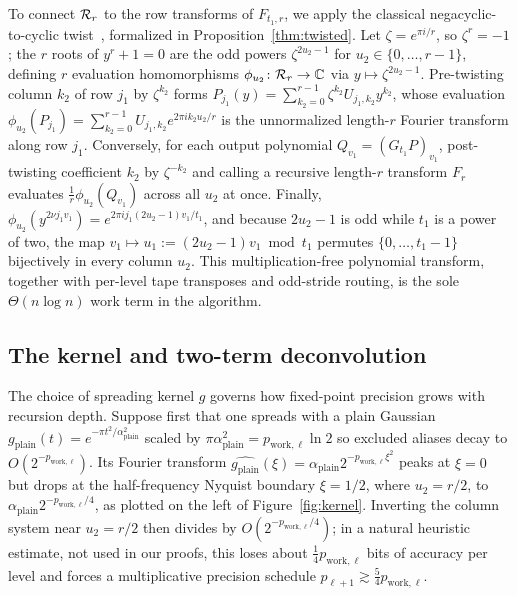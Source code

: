 To connect $\mathcal{R}_r$ to the row transforms of $F_{t_1, r}$, we apply the classical negacyclic-to-cyclic twist~\cite{SS71,CF94}, formalized in Proposition~\ref{thm:twisted}. Let $\zeta = e^{\pi i / r}$, so $\zeta^r = -1$; the $r$ roots of $y^r + 1 = 0$ are the odd powers $\zeta^{2u_2 - 1}$ for $u_2 \in \{0, \dots, r-1\}$, defining $r$ evaluation homomorphisms $\phi_{u_2}\colon \mathcal{R}_r \to \mathbb{C}$ via $y \mapsto \zeta^{2u_2 - 1}$. Pre-twisting column $k_2$ of row $j_1$ by $\zeta^{k_2}$ forms $P_{j_1}(y) = \sum_{k_2=0}^{r-1} \zeta^{k_2} U_{j_1, k_2} y^{k_2}$, whose evaluation $\phi_{u_2}(P_{j_1}) = \sum_{k_2=0}^{r-1} U_{j_1, k_2} e^{2\pi i k_2 u_2 / r}$ is the unnormalized length-$r$ Fourier transform along row $j_1$. Conversely, for each output polynomial $Q_{v_1} = (G_{t_1} P)_{v_1}$, post-twisting coefficient $k_2$ by $\zeta^{-k_2}$ and calling a recursive length-$r$ transform $F_r$ evaluates $\frac{1}{r}\phi_{u_2}(Q_{v_1})$ across all $u_2$ at once. Finally, $\phi_{u_2}(y^{2\nu j_1 v_1}) = e^{2\pi i j_1 (2u_2 - 1) v_1 / t_1}$, and because $2u_2 - 1$ is odd while $t_1$ is a power of two, the map $v_1 \mapsto u_1 := (2u_2 - 1) v_1 \bmod t_1$ permutes $\{0, \dots, t_1 - 1\}$ bijectively in every column $u_2$. This multiplication-free polynomial transform, together with per-level tape transposes and odd-stride routing, is the sole $\Theta(n \log n)$ work term in the algorithm.

\subsection{The kernel and two-term deconvolution}\label{sec:overview-kernel}

The choice of spreading kernel $g$ governs how fixed-point precision grows with recursion depth. Suppose first that one spreads with a plain Gaussian $g_{\mathrm{plain}}(t) = e^{-\pi t^2 / \alpha_{\mathrm{plain}}^2}$ scaled by $\pi \alpha_{\mathrm{plain}}^2 = p_{\mathrm{work},\ell} \ln 2$ so excluded aliases decay to $O(2^{-p_{\mathrm{work},\ell}})$. Its Fourier transform $\widehat{g_{\mathrm{plain}}}(\xi) = \alpha_{\mathrm{plain}} 2^{-p_{\mathrm{work},\ell} \xi^2}$ peaks at $\xi = 0$ but drops at the half-frequency Nyquist boundary $\xi = 1/2$, where $u_2 = r/2$, to $\alpha_{\mathrm{plain}} 2^{-p_{\mathrm{work},\ell}/4}$, as plotted on the left of Figure~\ref{fig:kernel}. Inverting the column system near $u_2 = r/2$ then divides by $O(2^{-p_{\mathrm{work},\ell}/4})$; in a natural heuristic estimate, not used in our proofs, this loses about $\tfrac{1}{4} p_{\mathrm{work},\ell}$ bits of accuracy per level and forces a multiplicative precision schedule $p_{\ell+1} \gtrsim \tfrac{5}{4} p_{\mathrm{work},\ell}$.

